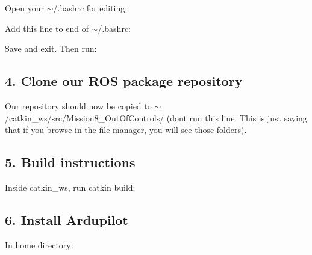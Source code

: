 Open your {\ttfamily $\sim$/.bashrc} for editing\+: 
\begin{DoxyCode}{0}
\end{DoxyCode}


Add this line to end of {\ttfamily $\sim$/.bashrc}\+: 
\begin{DoxyCode}{0}
\end{DoxyCode}
 Save and exit. Then run\+: 
\begin{DoxyCode}{0}
\end{DoxyCode}


\subsection*{4. Clone our R\+OS package repository}


\begin{DoxyCode}{0}
\end{DoxyCode}
 Our repository should now be copied to {\ttfamily $\sim$/catkin\+\_\+ws/src/\+Mission8\+\_\+\+Out\+Of\+Controls/} (don\textquotesingle{}t run this line. This is just saying that if you browse in the file manager, you will see those folders).

\subsection*{5. Build instructions}

Inside {\ttfamily catkin\+\_\+ws}, run {\ttfamily catkin build}\+:


\begin{DoxyCode}{0}
\end{DoxyCode}


\subsection*{6. Install Ardupilot}

In home directory\+: 
\begin{DoxyCode}{0}
\end{DoxyCode}


